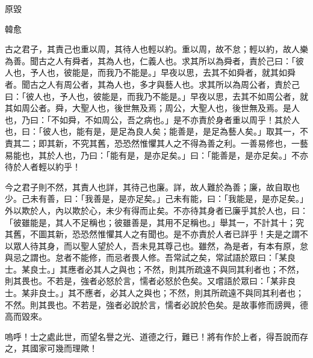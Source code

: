 原毀

韓愈

古之君子，其責己也重以周，其待人也輕以約。重以周，故不怠；輕以約，故人樂為善。聞古之人有舜者，其為人也，仁義人也。求其所以為舜者，責於己曰：「彼人也，予人也，彼能是，而我乃不能是。」早夜以思，去其不如舜者，就其如舜者。聞古之人有周公者，其為人也，多才與藝人也。求其所以為周公者，責於己曰：「彼人也，予人也，彼能是，而我乃不能是。」早夜以思，去其不如周公者，就其如周公者。舜，大聖人也，後世無及焉；周公，大聖人也，後世無及焉。是人也，乃曰：「不如舜，不如周公，吾之病也。」是不亦責於身者重以周乎！其於人也，曰：「彼人也，能有是，是足為良人矣；能善是，是足為藝人矣。」取其一，不責其二；即其新，不究其舊，恐恐然惟懼其人之不得為善之利。一善易修也，一藝易能也，其於人也，乃曰：「能有是，是亦足矣。」曰：「能善是，是亦足矣。」不亦待於人者輕以約乎！

今之君子則不然，其責人也詳，其待己也廉。詳，故人難於為善；廉，故自取也少。己未有善，曰：「我善是，是亦足矣。」己未有能，曰：「我能是，是亦足矣。」外以欺於人，內以欺於心，未少有得而止矣。不亦待其身者已廉乎其於人也，曰：「彼雖能是，其人不足稱也；彼雖善是，其用不足稱也。」舉其一，不計其十；究其舊，不圖其新，恐恐然惟懼其人之有聞也。是不亦責於人者已詳乎！夫是之謂不以眾人待其身，而以聖人望於人，吾未見其尊己也。雖然，為是者，有本有原，怠與忌之謂也。怠者不能修，而忌者畏人修。吾常試之矣，常試語於眾曰：「某良士。某良士。」其應者必其人之與也；不然，則其所疏遠不與同其利者也；不然，則其畏也。不若是，強者必怒於言，懦者必怒於色矣。又嚐語於眾曰：「某非良士。某非良士。」其不應者，必其人之與也；不然，則其所疏遠不與同其利者也；不然。則其畏也。不若是，強者必說於言，懦者必說於色矣。是故事修而謗興，德高而毀來。

嗚呼！士之處此世，而望名譽之光、道德之行，難已！將有作於上者，得吾說而存之，其國家可幾而理歟！